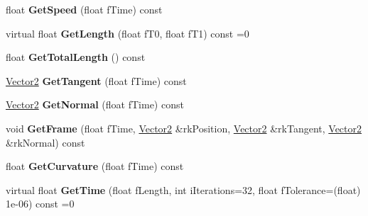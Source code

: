 \begin{DoxyCompactItemize}
\item 
float {\bfseries Get\+Speed} (float f\+Time) const \hypertarget{class_i_dream_sky_1_1_curve2_ac34e9eb60f7d5bc24a7f578d4947bd58}{}\label{class_i_dream_sky_1_1_curve2_ac34e9eb60f7d5bc24a7f578d4947bd58}

\item 
virtual float {\bfseries Get\+Length} (float f\+T0, float f\+T1) const  =0\hypertarget{class_i_dream_sky_1_1_curve2_ac7d8a40965e020416c7b34617e219e89}{}\label{class_i_dream_sky_1_1_curve2_ac7d8a40965e020416c7b34617e219e89}

\item 
float {\bfseries Get\+Total\+Length} () const \hypertarget{class_i_dream_sky_1_1_curve2_a5670b00e8aff0dd2f4233b485e81e3c2}{}\label{class_i_dream_sky_1_1_curve2_a5670b00e8aff0dd2f4233b485e81e3c2}

\item 
\hyperlink{class_i_dream_sky_1_1_vector2}{Vector2} {\bfseries Get\+Tangent} (float f\+Time) const \hypertarget{class_i_dream_sky_1_1_curve2_adc1276d9daa3322e0097c920019eb6c9}{}\label{class_i_dream_sky_1_1_curve2_adc1276d9daa3322e0097c920019eb6c9}

\item 
\hyperlink{class_i_dream_sky_1_1_vector2}{Vector2} {\bfseries Get\+Normal} (float f\+Time) const \hypertarget{class_i_dream_sky_1_1_curve2_aa08ffd40bccf0cb83ddb333ad74b3070}{}\label{class_i_dream_sky_1_1_curve2_aa08ffd40bccf0cb83ddb333ad74b3070}

\item 
void {\bfseries Get\+Frame} (float f\+Time, \hyperlink{class_i_dream_sky_1_1_vector2}{Vector2} \&rk\+Position, \hyperlink{class_i_dream_sky_1_1_vector2}{Vector2} \&rk\+Tangent, \hyperlink{class_i_dream_sky_1_1_vector2}{Vector2} \&rk\+Normal) const \hypertarget{class_i_dream_sky_1_1_curve2_a5d84a5cde48a15a54e7e563b61bd891f}{}\label{class_i_dream_sky_1_1_curve2_a5d84a5cde48a15a54e7e563b61bd891f}

\item 
float {\bfseries Get\+Curvature} (float f\+Time) const \hypertarget{class_i_dream_sky_1_1_curve2_a6171794217bb384ddd61614934e97fa3}{}\label{class_i_dream_sky_1_1_curve2_a6171794217bb384ddd61614934e97fa3}

\item 
virtual float {\bfseries Get\+Time} (float f\+Length, int i\+Iterations=32, float f\+Tolerance=(float) 1e-\/06) const  =0\hypertarget{class_i_dream_sky_1_1_curve2_aed5653174120ef2bc4ec662bc013d4a0}{}\label{class_i_dream_sky_1_1_curve2_aed5653174120ef2bc4ec662bc013d4a0}


\end{DoxyCompactItemize}
